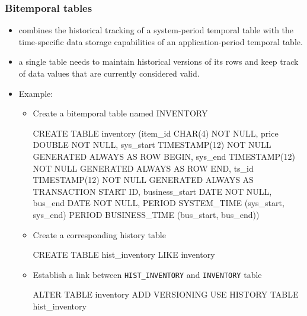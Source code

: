 \documentclass{article}
\begin{document}
\subsubsection{Bitemporal tables}
\begin{itemize}
	\item combines the historical tracking of a system-period temporal table with the time-specific data storage capabilities of an application-period temporal table.
	\item a single table needs to maintain historical versions of its rows and keep track of data values that are currently considered valid.
	\item Example: 
		\newpage
		\begin{itemize}
			\item Create a bitemporal table named INVENTORY
			\begin{sqlcode}
			CREATE TABLE inventory
			 (item_id         CHAR(4) NOT NULL,
			  price           DOUBLE NOT NULL,
			  sys_start       TIMESTAMP(12) NOT NULL
							    GENERATED ALWAYS AS ROW BEGIN,
			  sys_end  		  TIMESTAMP(12) NOT NULL
							    GENERATED ALWAYS AS ROW END,
			  ts_id			  TIMESTAMP(12) NOT NULL
							    GENERATED ALWAYS AS
							    TRANSACTION START ID, 
			  business_start  DATE NOT NULL,
			  bus_end         DATE NOT NULL,
			 PERIOD SYSTEM_TIME (sys_start, sys_end)
			 PERIOD BUSINESS_TIME (bus_start, bus_end))
			\end{sqlcode}
			\item Create a corresponding history table
			\begin{sqlcode}
			CREATE TABLE hist_inventory LIKE inventory
			\end{sqlcode}
			\item Establish a link between \texttt{HIST\_INVENTORY} and \texttt{INVENTORY} table
			\begin{sqlcode}
				ALTER TABLE inventory
				 ADD VERSIONING
				 USE HISTORY TABLE hist_inventory
			\end{sqlcode}
		\end{itemize}
\end{itemize}
%
%
\end{document}
